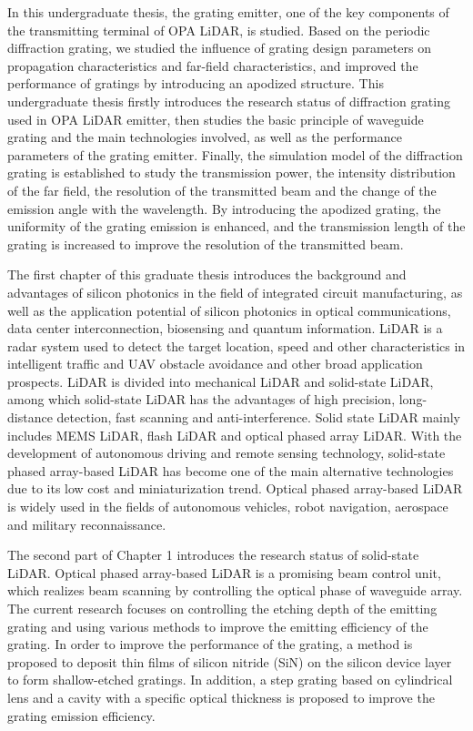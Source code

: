 \documentclass[UTF8,a4paper,12pt]{ctexart}
\numberwithin{equation}{section}
\begin{document}
In this undergraduate thesis, the grating emitter, one of the key components of the transmitting terminal of OPA LiDAR, is studied. Based on the periodic diffraction grating, we studied the influence of grating design parameters on propagation characteristics and far-field characteristics, and improved the performance of gratings by introducing an apodized structure. This undergraduate thesis firstly introduces the research status of diffraction grating used in 
OPA LiDAR emitter, then studies the basic principle of waveguide grating and the main technologies involved, as well as the performance parameters of the grating emitter. Finally, the simulation model of the diffraction grating is established to study the transmission power, the intensity distribution of the far field, the resolution of the transmitted beam and the change of the emission angle with the wavelength. By introducing the apodized grating, the uniformity of the grating emission is enhanced, and the transmission length of the grating is increased to improve the resolution of the transmitted beam.

The first chapter of this graduate thesis introduces the background and advantages of silicon photonics in the field of integrated circuit manufacturing, as well as the application potential of silicon photonics in optical communications, data center interconnection, biosensing and quantum information. LiDAR is a radar system used to detect the target location, speed and other characteristics in intelligent traffic and UAV obstacle avoidance and other broad application prospects. LiDAR is divided into mechanical LiDAR and solid-state LiDAR, among which solid-state LiDAR has the advantages of high precision, long-distance detection, fast scanning and anti-interference. Solid state LiDAR mainly includes MEMS LiDAR, flash LiDAR and optical phased array LiDAR. With the development of autonomous driving and remote sensing technology, solid-state phased array-based LiDAR has become one of the main alternative technologies due to its low cost and miniaturization trend. Optical phased array-based LiDAR is widely used in the fields of autonomous vehicles, robot navigation, aerospace and military reconnaissance.

The second part of Chapter 1 introduces the research status of solid-state LiDAR. Optical phased array-based LiDAR is a promising beam control unit, which realizes beam scanning by controlling the optical phase of waveguide array. The current research focuses on controlling the etching depth of the emitting grating and using various methods to improve the emitting efficiency of the grating. In order  to improve the performance of the grating, a method is proposed to deposit thin films of silicon nitride (SiN) on the silicon device layer to form shallow-etched gratings. In addition, a step grating based on cylindrical lens and a cavity with a specific optical thickness is proposed to improve the grating emission efficiency.
\end{document}
